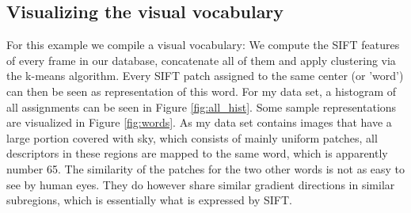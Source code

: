 \documentclass{paper}
\begin{document}
\subsection{Visualizing the visual vocabulary}
For this example we compile a visual vocabulary: We compute the SIFT features of every 
frame in our database, concatenate all of them and apply clustering via the k-means 
algorithm. Every SIFT patch assigned to the same center (or 'word') can then be 
seen as representation of this word. For my data set, a histogram of all assignments can be
seen in Figure \ref{fig:all_hist}. Some sample representations are visualized in Figure 
\ref{fig:words}. As my data set contains images that have a large portion covered with sky,
which consists of mainly uniform patches, all descriptors in these regions are mapped to
the same word, which is apparently number 65. The similarity of the patches for the two 
other words is not as easy to see by human eyes. They do however share similar gradient
directions in similar subregions, which is essentially what is expressed by SIFT. 
\end{document}
